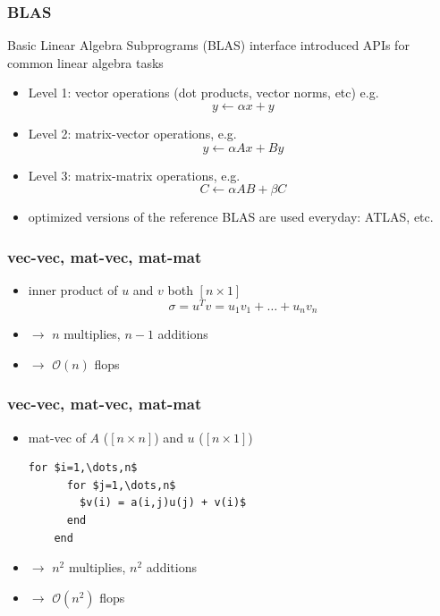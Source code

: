 \documentclass[10pt]{beamer}
\newcommand{\mO}{{\mathcal{O}}}
\begin{document}
\begin{frame}\frametitle{BLAS}
  Basic Linear Algebra Subprograms (BLAS) interface introduced APIs for common
linear algebra tasks
  \begin{itemize}
  \item Level 1: vector operations (dot products, vector norms, etc) e.g.
    \[
    y \leftarrow \alpha x + y
\]

  \item Level 2: matrix-vector operations, e.g.
    \[
    y \leftarrow \alpha A x +  B y
\]

  \item Level 3: matrix-matrix operations, e.g.
    \[
    C \leftarrow \alpha A B +  \beta C
\]
  \item optimized versions of the reference BLAS are used everyday:  ATLAS, etc.
  \end{itemize}
\end{frame}
\begin{frame}[fragile]
\frametitle{vec-vec, mat-vec, mat-mat}
\begin{itemize}
  \item inner product of $u$ and $v$ both $[n \times 1]$
  \begin{equation*}
    \sigma  = u^T v = u_1 v_1 + \dots + u_n v_n
  \end{equation*}
  \item $\rightarrow$ $n$ multiplies, $n-1$ additions
  \item $\rightarrow$ $\mO(n)$ flops
\end{itemize}
\end{frame}
\begin{frame}[fragile]
\frametitle{vec-vec, mat-vec, mat-mat}
\begin{itemize}
  \item mat-vec of $A$ ($[n \times n]$) and $u$ ($[n \times 1]$)
  \begin{lstlisting}[mathescape]
    for $i=1,\dots,n$
      for $j=1,\dots,n$
        $v(i) = a(i,j)u(j) + v(i)$
      end
    end
  \end{lstlisting}
  \item $\rightarrow$ $n^2$ multiplies, $n^2$ additions
  \item $\rightarrow$ $\mO(n^2)$ flops
\end{itemize}
\end{frame}
\end{document}
